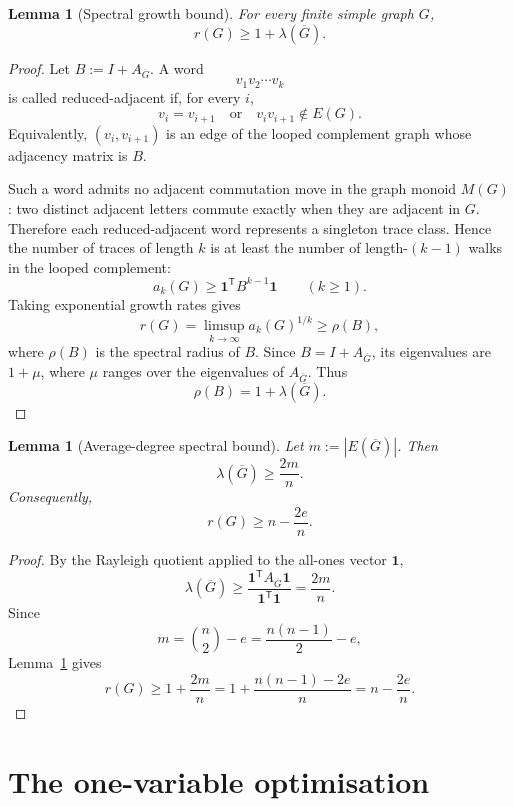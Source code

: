 \documentclass[11pt]{article}
\newtheorem{lemma}[theorem]{Lemma}
\newcommand{\E}{E}
\begin{document}
\begin{lemma}[Spectral growth bound]
\label{lem:spectral-growth-bound}
For every finite simple graph \(G\),
\[
        r(G)\ge 1+\lambda(\overline G).
\]
\end{lemma}

\begin{proof}
Let \(B:=I+A_{\overline G}\).  A word
\[
        v_1v_2\cdots v_k
\]
is called reduced-adjacent if, for every \(i\),
\[
        v_i=v_{i+1}
        \quad\text{or}\quad
        v_iv_{i+1}\notin \E(G).
\]
Equivalently, \((v_i,v_{i+1})\) is an edge of the looped complement graph whose
adjacency matrix is \(B\).

Such a word admits no adjacent commutation move in the graph monoid \(M(G)\): two
distinct adjacent letters commute exactly when they are adjacent in \(G\).  Therefore each
reduced-adjacent word represents a singleton trace class.  Hence the number of traces
of length \(k\) is at least the number of length-\((k-1)\) walks in the looped complement:
\[
        a_k(G)
        \ge
        \mathbf{1}^{\mathsf T}B^{k-1}\mathbf{1}
        \qquad(k\ge 1).
\]
Taking exponential growth rates gives
\[
        r(G)
        =
        \limsup_{k\to\infty}a_k(G)^{1/k}
        \ge
        \rho(B),
\]
where \(\rho(B)\) is the spectral radius of \(B\).  Since \(B=I+A_{\overline G}\),
its eigenvalues are \(1+\mu\), where \(\mu\) ranges over the eigenvalues of
\(A_{\overline G}\).  Thus
\[
        \rho(B)=1+\lambda(\overline G).
\]
\end{proof}

\begin{lemma}[Average-degree spectral bound]
\label{lem:average-degree-spectral}
Let \(m:=|\E(\overline G)|\).  Then
\[
        \lambda(\overline G)\ge \frac{2m}{n}.
\]
Consequently,
\[
        r(G)\ge n-\frac{2e}{n}.
\]
\end{lemma}

\begin{proof}
By the Rayleigh quotient applied to the all-ones vector \(\mathbf{1}\),
\[
        \lambda(\overline G)
        \ge
        \frac{\mathbf{1}^{\mathsf T}A_{\overline G}\mathbf{1}}
             {\mathbf{1}^{\mathsf T}\mathbf{1}}
        =
        \frac{2m}{n}.
\]
Since
\[
        m=\binom n2-e=\frac{n(n-1)}2-e,
\]
Lemma~\ref{lem:spectral-growth-bound} gives
\[
        r(G)
        \ge
        1+\frac{2m}{n}
        =
        1+\frac{n(n-1)-2e}{n}
        =
        n-\frac{2e}{n}.
\]
\end{proof}

\section{The one-variable optimisation}
\end{document}
